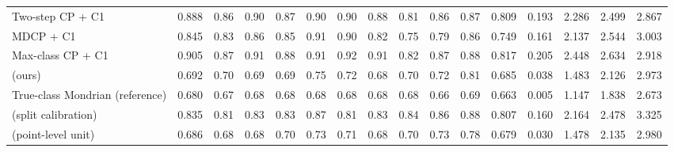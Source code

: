 \begin{table}[!htbp]
{\begin{tabular}{lccccccccccccccc}
Two-step CP + C1 & 0.888 & 0.86 & 0.90 & 0.87 & 0.90 & 0.90 & 0.88 & 0.81 & 0.86 & 0.87 & 0.809 & 0.193 & 2.286 & 2.499 & 2.867 \\
MDCP + C1 & 0.845 & 0.83 & 0.86 & 0.85 & 0.91 & 0.90 & 0.82 & 0.75 & 0.79 & 0.86 & 0.749 & 0.161 & 2.137 & 2.544 & 3.003 \\
Max-class CP + C1 & 0.905 & 0.87 & 0.91 & 0.88 & 0.91 & 0.92 & 0.91 & 0.82 & 0.87 & 0.88 & 0.817 & 0.205 & 2.448 & 2.634 & 2.918 \\
\gamut{} (ours) & 0.692 & 0.70 & 0.69 & 0.69 & 0.75 & 0.72 & 0.68 & 0.70 & 0.72 & 0.81 & 0.685 & 0.038 & 1.483 & 2.126 & 2.973 \\
True-class Mondrian (reference) & 0.680 & 0.67 & 0.68 & 0.68 & 0.68 & 0.68 & 0.68 & 0.68 & 0.66 & 0.69 & 0.663 & 0.005 & 1.147 & 1.838 & 2.673 \\
\gamut{} (split calibration) & 0.835 & 0.81 & 0.83 & 0.83 & 0.87 & 0.81 & 0.83 & 0.84 & 0.86 & 0.88 & 0.807 & 0.160 & 2.164 & 2.478 & 3.325 \\
\gamut{} (point-level unit) & 0.686 & 0.68 & 0.68 & 0.70 & 0.73 & 0.71 & 0.68 & 0.70 & 0.73 & 0.78 & 0.679 & 0.030 & 1.478 & 2.135 & 2.980 \\
\bottomrule
\end{tabular}}
\end{table}

